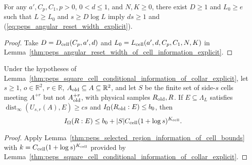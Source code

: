 \begin{lemma}
    \label{thm:peps_angular_reset_width_of_cell_information}
    \leanok
    For any $a',C_p,C_1,p>0$, $0<d\le1$, and $N,K\ge0$, there exist $D\ge1$ and $L_0\ge e$ such that $L\ge L_0$ and $s\ge D\log L$ imply $ds\ge1$ and (\ref{eq:peps_angular_reset_width_explicit}).
\end{lemma}
\begin{proof}\leanok
    Take $D=D_{\rm cell}(C_p,a',d)$ and $L_0=L_{\rm cell}(a',d,C_p,C_1,N,K)$ in
    Lemma~\ref{thm:peps_angular_reset_width_of_cell_information_explicit}.
\end{proof}

\begin{lemma}
    \label{thm:peps_selected_region_information_of_collar_explicit}
    \leanok
    Under the hypotheses of Lemma~\ref{thm:peps_square_cell_conditional_information_of_collar_explicit}, let $s\ge1$, $o\in\mathbb R^2$, $r\in\mathbb R$, $A_{\rm old}\subseteq A\subseteq\mathbb R^2$, and let $S$ be the finite set of side-$s$ cells meeting $A^{+r}$ but not $A_{\rm old}^{+r}$, with physical samples $R_{\rm old},R$.
    If $E\subseteq\Lambda_L$ satisfies $\operatorname{dist}_\infty(U_{s,r}(A),E)\ge cs$ and $I_\Omega(R_{\rm old}:E)\le b_0$, then
    \begin{align}
        I_\Omega(R:E) & \le b_0+|S|C_{\rm cell}(1+\log s)^{K_{\rm cell}}.
        \label{eq:peps_selected_region_collar_explicit}
    \end{align}
\end{lemma}
\begin{proof}\leanok
    Apply Lemma~\ref{thm:peps_selected_region_information_of_cell_bounds} with $k=C_{\rm cell}(1+\log s)^{K_{\rm cell}}$ provided by Lemma~\ref{thm:peps_square_cell_conditional_information_of_collar_explicit}.
\end{proof}

